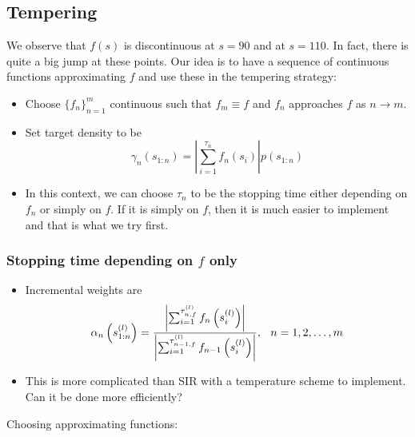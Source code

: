\documentclass{article}
\begin{document}
\subsection{Tempering} 

We observe that $f(s)$ is discontinuous at $s = 90$ and at $s = 110$. In fact, there is quite a big jump at these points. Our idea is to have a sequence of continuous functions approximating $f$ and use these in the tempering strategy: 

\begin{itemize}

\item Choose $ \{ f_{n} \}_{n=1}^{m} $ continuous such that $f_{m} \equiv f$ and $f_{n}$ approaches $f$ as $n \rightarrow m$.

\item Set target density to be 
$$ \gamma_{n}(s_{1:n}) = \left | \sum_{i=1}^{\tau_{n}} f_{n} (s_{i}) \right | p(s_{1:n}) $$

\item In this context, we can choose $\tau_{n}$ to be the stopping time either depending on $f_{n}$ or simply on $f$. If it is simply on $f$, then it is much easier to implement and that is what we try first. 

\end{itemize}

\subsubsection{Stopping time depending on $f$ only}

\begin{itemize}
\item Incremental weights are
$$ \alpha_{n} \left (s_{1:n}^{(l)} \right ) = \frac{ \left | \sum_{i=1}^{\tau_{n,f}^{(l)}} f_{n} \left (s_{i}^{(l)} \right ) \right | } { \left | \sum_{i=1}^{\tau_{n-1,f}^{(l)}} f_{n-1} \left ( s_{i}^{(l)} \right) \right | }, \hspace{0.1in} n = 1, 2, \ldots, m $$
\item This is more complicated than SIR with a temperature scheme to implement. Can it be done more efficiently?
\end{itemize}
Choosing approximating functions: 
\end{document}
